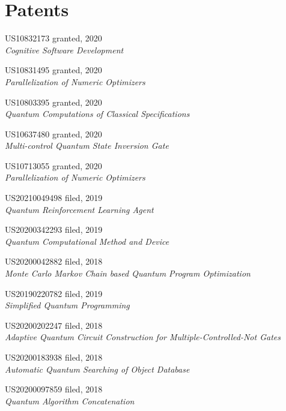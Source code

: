 \section{\sc Patents}

{\sc US10832173} \hfill {\sc granted}, 2020\\
\emph{Cognitive Software Development}

{\sc US10831495} \hfill {\sc granted}, 2020\\
\emph{Parallelization of Numeric Optimizers}

{\sc US10803395} \hfill {\sc granted}, 2020\\
\emph{Quantum Computations of Classical Specifications}

{\sc US10637480} \hfill {\sc granted}, 2020\\
\emph{Multi-control Quantum State Inversion Gate}

{\sc US10713055} \hfill {\sc granted}, 2020\\
\emph{Parallelization of Numeric Optimizers}

{\sc US20210049498} \hfill {\sc filed}, 2019\\
\emph{Quantum Reinforcement Learning Agent}

{\sc US20200342293} \hfill {\sc filed}, 2019\\
\emph{Quantum Computational Method and Device}

{\sc US20200042882} \hfill {\sc filed}, 2018\\
\emph{Monte Carlo Markov Chain based Quantum Program Optimization}

{\sc US20190220782} \hfill {\sc filed}, 2019\\
\emph{Simplified Quantum Programming}

{\sc US20200202247} \hfill {\sc filed}, 2018\\
\emph{Adaptive Quantum Circuit Construction for Multiple-Controlled-Not Gates}

{\sc US20200183938} \hfill {\sc filed}, 2018\\
\emph{Automatic Quantum Searching of Object Database}

{\sc US20200097859} \hfill {\sc filed}, 2018\\
\emph{Quantum Algorithm Concatenation}
